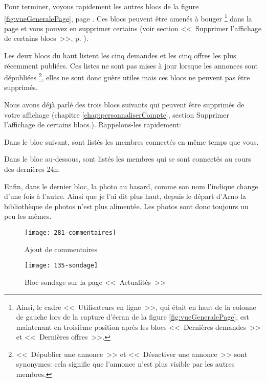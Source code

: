 Pour terminer, voyons rapidement les autres blocs de la figure \ref{fig:vueGeneralePage}, page \pageref{fig:vueGeneralePage}. Ces blocs peuvent être amenés à bouger%
\footnote{Ainsi, le cadre <<~Utilisateurs en ligne~>>, qui était en haut de la colonne de gauche lors de la capture d'écran de la figure \ref{fig:vueGeneralePage}, est maintenant en troisième position après les blocs <<~Dernières demandes~>> et <<~Dernières offres~>>.}
dans la page et vous pouvez en supprimer certains (voir section <<~Supprimer l'affichage de certains blocs~>>, p. \pageref{sec:supprimerBlocs}).

 
Les deux blocs du haut listent les cinq demandes et les cinq offres les plus récemment publiées. Ces listes ne sont pas mises à jour lorsque les annonces sont dépubliées%
\footnote{<<~Dépublier une annonce~>> et <<~Désactiver une annonce~>> sont synonymes: cela signifie que l'annonce n'est plus visible par les autres membres.}, 
elles ne sont donc guère utiles mais ces blocs ne peuvent pas être supprimés.

Nous avons déjà parlé des trois blocs suivants qui peuvent être supprimés de votre affichage (chapitre \ref{chap:personnaliserCompte}, section \og{}Supprimer l'affichage de certains blocs\fg.). Rappelons-les rapidement:

Dans le bloc suivant, sont listés les membres connectés en même temps que vous.

Dans le bloc au-dessous, sont listés les membres qui se sont connectés au cours des dernières 24h.

Enfin, dans le dernier bloc, la photo au hasard, comme son nom l’indique change d’une fois à l’autre. Ainsi que je l’ai dit plus haut, depuis le départ d’Arno la bibliothèque de photos n’est plus alimentée. Les photos sont donc toujours un peu les mêmes.


\begin{figure}
    \centering
    \texttt{[image: 281-commentaires]}
    \caption{Ajout de commentaires}
    \label{fig:commentaires}
\end{figure}
\begin{figure}
    \centering
    \texttt{[image: 135-sondage]}
    \caption{Bloc sondage sur la page <<~Actualités~>>}
    \label{fig:sondage}
\end{figure}

